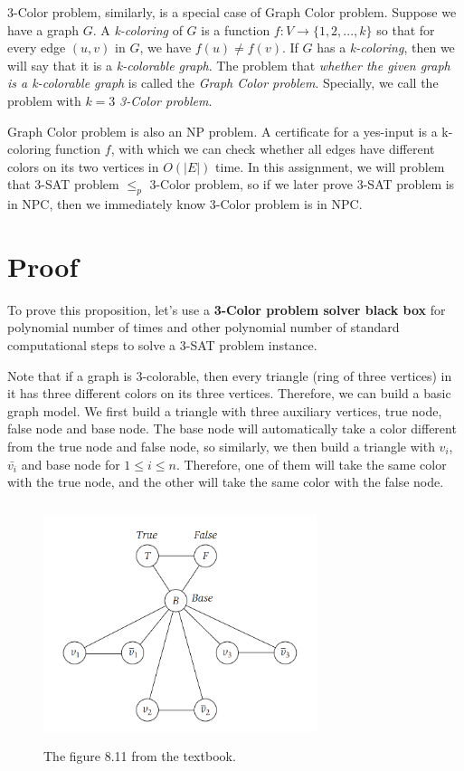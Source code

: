 \documentclass{article}
\begin{document}
3-Color problem, similarly, is a special case of Graph Color problem. Suppose we have a graph $G$. A \textit{k-coloring} of $G$ is a function $f:V\to\{1,2,...,k\}$ so that for every edge $(u,v)$ in $G$, we have $f(u)\not=f(v)$. If $G$ has a \textit{k-coloring}, then we will say that it is a \textit{k-colorable graph}. The problem that \textit{whether the given graph is a k-colorable graph} is called the \textit{Graph Color problem}. Specially, we call the problem with $k=3$ \textit{3-Color problem}.

Graph Color problem is also an NP problem. A certificate for a yes-input is a k-coloring function $f$, with which we can check whether all edges have different colors on its two vertices in $O(|E|)$ time. In this assignment, we will problem that 3-SAT problem $\leq_p$ 3-Color problem, so if we later prove 3-SAT problem is in NPC, then we immediately know 3-Color problem is in NPC.

\section{Proof}

To prove this proposition, let's use a \textbf{3-Color problem solver black box} for polynomial number of times and other polynomial number of standard computational steps to solve a 3-SAT problem instance.

Note that if a graph is 3-colorable, then every triangle (ring of three vertices) in it has three different colors on its three vertices. Therefore, we can build a basic graph model. We first build a triangle with three auxiliary vertices, true node, false node and base node. The base node will automatically take a color different from the true node and false node, so similarly, we then build a triangle with $v_i$, $\bar{v_i}$ and base node for $1\le i\le n$. Therefore, one of them will take the same color with the true node, and the other will take the same color with the false node.

\begin{figure}[h]
    \centering
    \includegraphics[height=7cm,width=8cm]{figure/1.png}
    \caption{The figure 8.11 from the textbook.}
    \label{1}
\end{figure}
\end{document}
